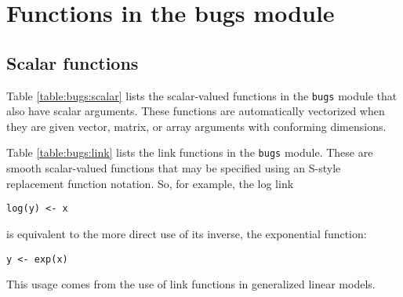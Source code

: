\documentclass[11pt, a4paper, titlepage]{report}
\begin{document}
\section{Functions in the bugs module}

\subsection{Scalar functions}

Table \ref{table:bugs:scalar} lists the scalar-valued functions in the
\texttt{bugs} module that also have scalar arguments.  These functions
are automatically vectorized when they are given vector, matrix, or
array arguments with conforming dimensions.

Table \ref{table:bugs:link} lists the link functions in the
\texttt{bugs} module.  These are smooth scalar-valued functions that
may be specified using an S-style replacement function notation. So,
for example, the log link
\begin{verbatim}
log(y) <- x
\end{verbatim}
is equivalent to the more direct use of its inverse, the exponential
function:
\begin{verbatim}
y <- exp(x)
\end{verbatim}
This usage comes from the use of link functions in generalized linear
models.
\end{document}
